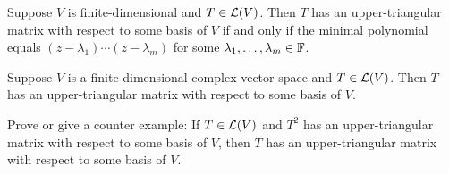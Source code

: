 \documentclass{extarticle}
\begin{document}
\begin{lemma}
    Suppose \(V\) is finite-dimensional and \(T \in \mathcal{L}(V)\). Then \(T\) has an upper-triangular matrix 
    with respect to some basis of \(V\) if and only if the minimal polynomial equals 
    \((z - \lambda_1)\cdots(z - \lambda_m)\) for some \(\lambda_1, \ldots, \lambda_m \in \mathbb{F}\).
\end{lemma}

\begin{thm}[if \(\F = \C\), then every operator on \(V\) has an upper-triangular matrix]
    Suppose \(V\) is a finite-dimensional complex vector space and \(T \in \mathcal{L}(V)\). Then \(T\) 
    has an upper-triangular matrix with respect to some basis of \(V\).
\end{thm}


\newpage 
{}

\begin{problem}{1}
    Prove or give a counter example: If \(T \in \mathcal{L}(V)\) and \(T^2\) has an upper-triangular matrix with 
    respect to some basis of \(V\), then \(T\) has an upper-triangular matrix with respect to some basis 
    of \(V\).
\end{problem}
\end{document}
